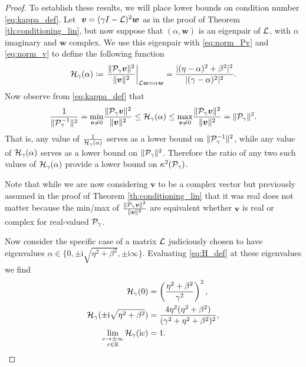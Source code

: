 \documentclass[a4paper,10pt]{article}
\begin{document}
\begin{proof}
To establish these results, we will place lower bounds on condition number \eqref{eq:kappa_def}.
%
Let $~\bm{v}=(\gamma I - {\cal L})^2 \bm{w}$ as in the proof of Theorem \ref{th:conditioning_lin}, but now suppose that $(\alpha, \bm{w})$ is an eigenpair of ${\cal L}$, with $\alpha$ imaginary and $\bm{w}$ complex. We use this eigenpair with \eqref{eq:norm_Pv} and \eqref{eq:norm_v} to define the following function
\begin{align} \label{eq:H_def}
{\cal H}_{\gamma}(\alpha) 
\coloneqq 
\left. \frac{\Vert {\cal P}_{\gamma} \bm{v} \Vert^2 }{\Vert \bm{v} \Vert^2} \right|_{{\cal L} \bm{w} = \alpha \bm{w}}
=
\frac{|(\eta-\alpha)^2 + \beta^2|^2}{|(\gamma - \alpha)^2|^2}.
\end{align}
Now observe from \eqref{eq:kappa_def} that
\begin{align}
\label{eq:H_bounds}
\frac{1}{\Vert {\cal P}_{\gamma}^{-1} \Vert^2}
=
\underset{\bm{v} \neq 0}{\min} \frac{\Vert {\cal P}_{\gamma} \bm{v} \Vert^2}{\Vert \bm{v} \Vert^2}
\leq {\cal H}_{\gamma}(\alpha) \leq 
\underset{\bm{v} \neq 0}{\max} \frac{\Vert {\cal P}_{\gamma} \bm{v} \Vert^2}{\Vert \bm{v} \Vert^2} = \Vert {\cal P}_{\gamma} \Vert^2.
\end{align}
That is, any value of $\tfrac{1}{{\cal H}_{\gamma}(\alpha)}$ serves as a lower bound on $\Vert {\cal P}_{\gamma}^{-1} \Vert^2$, while any value of ${\cal H}_{\gamma}(\alpha)$ serves as a lower bound on $\Vert {\cal P}_{\gamma} \Vert^2$. Therefore the ratio of any two such values of ${\cal H}_{\gamma}(\alpha)$ provide a lower bound on $\kappa^2({\cal P}_{\gamma})$.

Note that while we are now considering $\bm{v}$ to be a complex vector but previously assumed in the proof of Theorem \ref{th:conditioning_lin} that it was real does not matter because the min/max of $\frac{\Vert {\cal P}_{\gamma} \bm{v} \Vert^2}{\Vert \bm{v} \Vert^2}$ are equivalent whether $\bm{v}$ is real or complex for real-valued ${\cal P}_{\gamma}$.

Now consider the specific case of a matrix ${\cal L}$ judiciously chosen to have eigenvalues $\alpha \in \{0, \pm \mathrm{i} \sqrt{\eta^2 + \beta^2}, \pm \mathrm{i} \infty\}$. Evaluating \eqref{eq:H_def} at these eigenvalues we find
\begin{align}
\label{eq:H1}
{\cal H}_{\gamma}(0) 
&= 
\left( \frac{\eta^2 + \beta^2}{\gamma^2} \right)^2, \\
\label{eq:H2}
{\cal H}_{\gamma}(\pm \mathrm{i} \sqrt{\eta^2 + \beta^2}) 
&= 
\frac{4 \eta^2 ( \eta^2 + \beta^2)}{(\gamma^2 + \eta^2 + \beta^2)^2}, 
\\
\label{eq:H3}
\lim_{\substack{c \to \pm \infty\\ c \in \mathbb{R}}} {\cal H}_{\gamma}(\mathrm{i} c) 
&=
1.
\end{align}


\end{proof}
\end{document}
